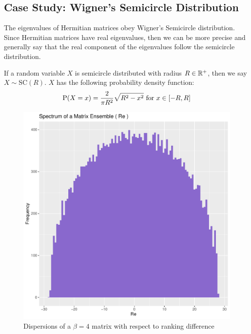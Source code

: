 \subsection{Case Study: Wigner's Semicircle Distribution}

The eigenvalues of Hermitian matrices obey Wigner's Semicircle distribution. Since Hermitian matrices have real eigenvalues, then we can be more precise and generally say that the real component of the eigenvalues follow the semicircle distribution.

\begin{definition}
If a random variable $X$ is semicircle distributed with radius $R \in \mathbb{R}^+$, then we say $X \sim \text{SC}(R)$. $X$ has the following probability density function:
$$\text{P}(X = x) = \frac{2}{\pi R^2} \sqrt{R^2 - x^2} \text{ for } x \in [-R, R]$$
\end{definition}


\begin{figure}[h]
 \begin{center}
  \includegraphics[scale = 0.7]{../graphics/chap2/2-3-2_semicircle}
  \caption{Dispersions of a $\beta = 4$ matrix with respect to ranking difference}
 \end{center}
 \label{semicircleplot}
\end{figure}

